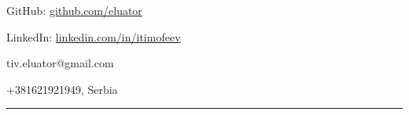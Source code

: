\documentclass[11pt]{article}
\begin{document}
\begin{center}
\end{center}
 
\vspace{0.5em}

\begin{multicols}{2}

GitHub: \href{https://github.com/eluator}{github.com/eluator}

LinkedIn: \href{https://www.linkedin.com/in/itimofeev}{linkedin.com/in/itimofeev}

\columnbreak

tiv.eluator@gmail.com

+381621921949, Serbia

\end{multicols} 
\hrule
 
\end{document}
